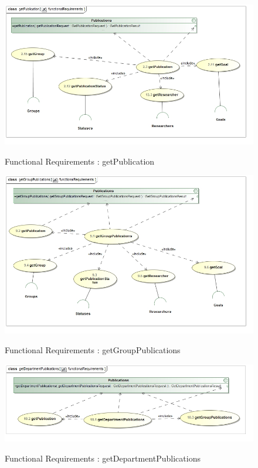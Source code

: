 \documentclass{article}
\begin{document}
		\begin{figure}[H]
		\includegraphics[width=16cm]{Quinton_Diagrams/class__getPublication__functionalRequirements.jpg}  \\
		\caption{Functional Requirements : getPublication}
		\end{figure}
		
		\begin{figure}[H]
		\includegraphics[width=16cm]{Quinton_Diagrams/class__getGroupPublications__functionalRequirements.jpg}  \\
		\caption{Functional Requirements : getGroupPublications}
		\end{figure}
		
		\begin{figure}[H]
		\includegraphics[width=\textwidth]{Quinton_Diagrams/class__getDepartmentPublications__functionalRequirements.jpg}  \\
		\caption{Functional Requirements : getDepartmentPublications}
		\end{figure}
		
\end{document}
